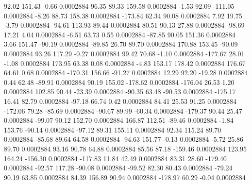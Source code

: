        92.02      151.43       -0.66     0.0002884
       96.35       89.33      159.58     0.0002884
       -1.53       92.09     -111.05     0.0002884
       -8.26       88.73      158.38     0.0002884
     -173.84       62.34       90.08     0.0002884
        7.92       19.75       -3.79     0.0002884
      -94.61      113.93       89.44     0.0002884
       80.51       90.13       27.88     0.0002884
      -98.69       17.21        4.04     0.0002884
       -6.51       63.73        0.55     0.0002884
      -87.85       90.05      151.36     0.0002884
        3.66      151.47      -90.19     0.0002884
      -89.85       26.70       89.70     0.0002884
      170.88      153.45      -90.09     0.0002884
       93.26      117.29       -0.27     0.0002884
       99.42       70.68       -1.10     0.0002884
     -177.67       28.01       -1.08     0.0002884
      173.95       63.38        0.08     0.0002884
       -4.83      153.17      178.42     0.0002884
      176.67       64.61        0.68     0.0002884
     -170.31      156.66      -91.27     0.0002884
       12.29       92.20      -19.28     0.0002884
        0.44       62.48      -89.91     0.0002884
       90.19      155.02     -178.62     0.0002884
     -176.04       26.53        1.20     0.0002884
      102.85       90.44      -23.39     0.0002884
      -90.35       63.48      -90.53     0.0002884
     -175.17       16.41       82.79     0.0002884
      -97.18       66.74        0.42     0.0002884
       84.41       25.53       91.25     0.0002884
     -172.06       79.28      -85.69     0.0002884
      -90.67       89.99      -60.34     0.0002884
     -179.37       90.44       25.47     0.0002884
      -99.07       90.12      152.70     0.0002884
      166.87      112.51      -89.46     0.0002884
       -1.84      153.76      -90.14     0.0002884
      -97.12       89.31      155.11     0.0002884
       92.34      115.24       89.70     0.0002884
      -85.68       89.64       64.58     0.0002884
      -94.63      151.77       -0.13     0.0002884
       -5.72       25.86       89.70     0.0002884
       93.16       90.78       64.88     0.0002884
       85.56       87.18     -159.46     0.0002884
      123.95      164.24     -156.30     0.0002884
     -117.83       11.84       42.49     0.0002884
       83.31       28.60     -179.40     0.0002884
      -92.57      117.28      -90.08     0.0002884
      -99.52       82.30       80.43     0.0002884
      -79.24       90.19       63.85     0.0002884
       84.39      156.89       90.94     0.0002884
     -178.97       60.29       -0.04     0.0002884
